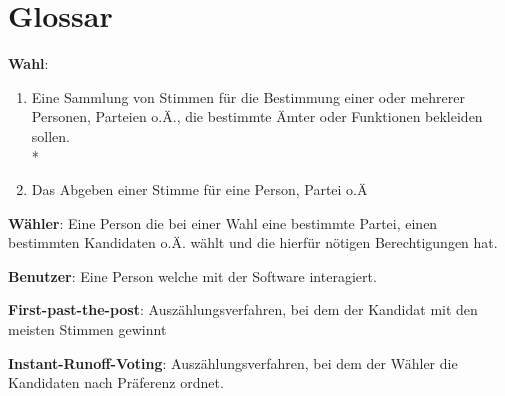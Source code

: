 \documentclass[parskip=full,11pt,twoside]{scrartcl}
\begin{document}
\section{Glossar}

\textbf{Wahl}:
\begin{enumerate}
	\item Eine Sammlung von Stimmen für die Bestimmung einer oder mehrerer Personen, Parteien o.Ä., die bestimmte Ämter oder Funktionen bekleiden sollen. \\*
	\item Das Abgeben einer Stimme für eine Person, Partei o.Ä
\end{enumerate}

\textbf{Wähler}:
Eine Person die bei einer Wahl eine bestimmte Partei, einen bestimmten Kandidaten o.Ä. wählt und die hierfür nötigen Berechtigungen hat.

\textbf{Benutzer}:
Eine Person welche mit der Software interagiert.

\textbf{First-past-the-post}:
Auszählungsverfahren, bei dem der Kandidat mit den meisten Stimmen gewinnt

\textbf{Instant-Runoff-Voting}:
Auszählungsverfahren, bei dem der Wähler die Kandidaten nach Präferenz ordnet.
\end{document}
